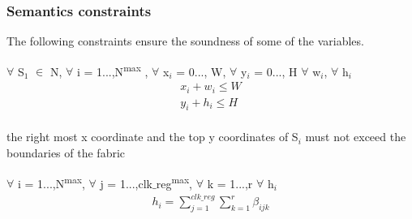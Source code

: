\begin{comment}
Slots for partial reconfiguration should fulfill the following constraints
\begin{itemize}
\item there must be enough resources within the slots
\item A frame can not be shared between two reconfigurable partitions (no interference)
\item static resources on the FPGA must not be included in the slots 
\item Left and right edges of slots must be placed in proper positions
\item the amount of wasted resources should be minimized (Wasting DSPs is more expensive than BRAMs which in turn is more expensive than CLBs)
\item Other optimizations such as lower wire length between slots or lower length to I/O etc... can be added as constraints
\end{itemize}

\end{comment}
\hfill \break

\subsubsection{\textbf {Semantics constraints}}
The following constraints ensure the soundness of some of the variables.\\
\begin{constraint} $\forall$ S$_1$ $\in$ N, $\forall$ i = 1...,N\textsuperscript{max} , $\forall$ x$_i$ = 0..., W, $\forall$ y$_i$ = 0..., H $\forall$ w$_i$, $\forall$ h$_i$    
\begin{equation}
\begin{split}
x_i + w_i \leq W \\
y_i + h_i \leq H \\
\end{split}
\end{equation} 
\end{constraint}
\begin{defn} the right most x coordinate and the top y coordinates of S$_i$ must not exceed the boundaries of the fabric \\
\end{defn}

\begin{constraint} $\forall$ i = 1...,N\textsuperscript{max}, $\forall$ j = 1...,clk$\_$reg\textsuperscript{max}, $\forall$ k = 1...,r $\forall$ h$_i$
\begin{equation}
\begin{split}
 h_i = \sum_{j=1}^{clk\_reg} \sum_{k=1}^{r} \beta_{ijk}
\end{split}
\end{equation}
\end{constraint}

